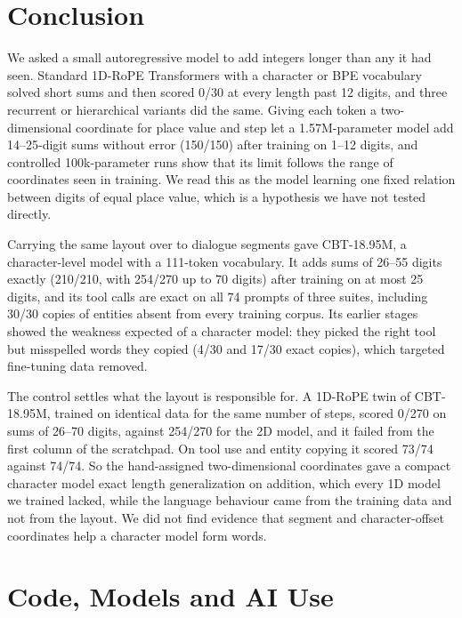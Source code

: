\documentclass[10pt,twocolumn]{article}
\begin{document}
\section{Conclusion}\label{sec:conclusion}

We asked a small autoregressive model to add integers longer than any it had seen. Standard 1D-RoPE Transformers with a character or BPE vocabulary solved short sums and then scored 0/30 at every length past 12 digits, and three recurrent or hierarchical variants did the same. Giving each token a two-dimensional coordinate for place value and step let a 1.57M-parameter model add 14--25-digit sums without error (150/150) after training on 1--12 digits, and controlled 100k-parameter runs show that its limit follows the range of coordinates seen in training. We read this as the model learning one fixed relation between digits of equal place value, which is a hypothesis we have not tested directly.

Carrying the same layout over to dialogue segments gave CBT-18.95M, a character-level model with a 111-token vocabulary. It adds sums of 26--55 digits exactly (210/210, with 254/270 up to 70 digits) after training on at most 25 digits, and its tool calls are exact on all 74 prompts of three suites, including 30/30 copies of entities absent from every training corpus. Its earlier stages showed the weakness expected of a character model: they picked the right tool but misspelled words they copied (4/30 and 17/30 exact copies), which targeted fine-tuning data removed.

The control settles what the layout is responsible for. A 1D-RoPE twin of CBT-18.95M, trained on identical data for the same number of steps, scored 0/270 on sums of 26--70 digits, against 254/270 for the 2D model, and it failed from the first column of the scratchpad. On tool use and entity copying it scored 73/74 against 74/74. So the hand-assigned two-dimensional coordinates gave a compact character model exact length generalization on addition, which every 1D model we trained lacked, while the language behaviour came from the training data and not from the layout. We did not find evidence that segment and character-offset coordinates help a character model form words.

\section*{Code, Models and AI Use}
\end{document}

